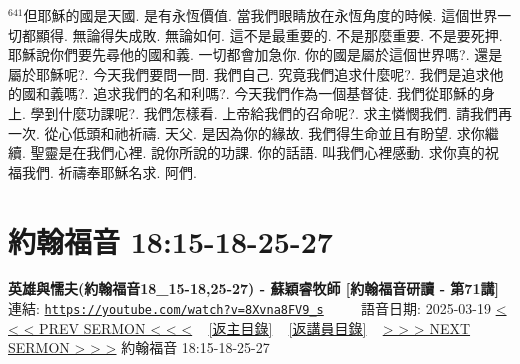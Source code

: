 \documentclass{book}
\begin{document}
$^{641}$但耶穌的國是天國.
是有永恆價值.
當我們眼睛放在永恆角度的時候.
這個世界一切都顯得.
無論得失成敗.
無論如何.
這不是最重要的.
不是那麼重要.
不是要死押.
耶穌說你們要先尋他的國和義.
一切都會加急你.
你的國是屬於這個世界嗎?.
還是屬於耶穌呢?.
今天我們要問一問.
我們自己.
究竟我們追求什麼呢?.
我們是追求他的國和義嗎?.
追求我們的名和利嗎?.
今天我們作為一個基督徒.
我們從耶穌的身上.
學到什麼功課呢?.
我們怎樣看.
上帝給我們的召命呢?.
求主憐憫我們.
請我們再一次.
從心低頭和祂祈禱.
天父.
是因為你的緣故.
我們得生命並且有盼望.
求你繼續.
聖靈是在我們心裡.
說你所說的功課.
你的話語.
叫我們心裡感動.
求你真的祝福我們.
祈禱奉耶穌名求.
阿們.
\newpage



\section{約翰福音 18:15-18-25-27}
\label{sec:8Xvna8FV9_s}
\textbf{英雄與懦夫(約翰福音18\_15-18,25-27) - 蘇穎睿牧師 [約翰福音研讀 - 第71講]}
\newline
\newline
連結: \href{https://youtube.com/watch?v=8Xvna8FV9_s}{\texttt{https://youtube.com/watch?v=8Xvna8FV9\_s}} ~~~~ 語音日期: 2025-03-19
\newline
\newline
\hyperref[sec:Soyt_RP__Tk]{< < < PREV SERMON < < <}
~
\hyperlink{toc}{[返主目錄]}
~
\hyperref[ch:preacher11]{[返講員目錄]}
~
\hyperref[sec:Ujp9LOC7dII]{> > > NEXT SERMON > > >}
\newline
\newline
約翰福音 18:15-18-25-27
\newline
\end{document}
